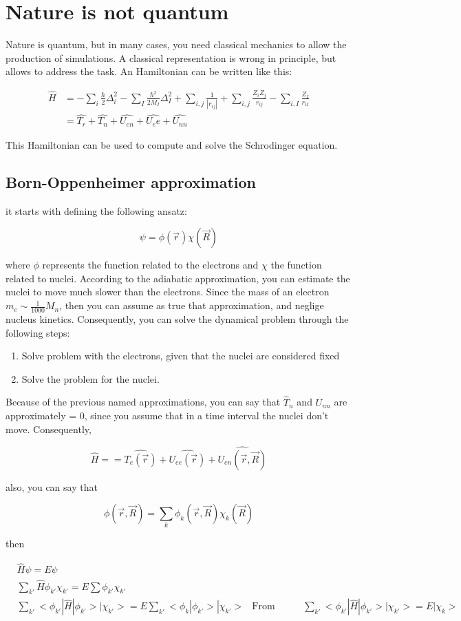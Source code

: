 \section{Nature is not quantum}
Nature is quantum, but in many cases, you need classical mechanics to allow the production of simulations.
A classical representation is wrong in principle, but allows to address the task.
An Hamiltonian can be written like this:

\begin{align*}
    \hat{H} &= - \sum_i{\frac{\hbar}{2} \Delta_i^2} - \sum_{I}{\frac{\hbar^2 }{2M_I} \Delta_I^2} + \sum_{i,j}\frac{1}{|r_{ij}|} + \sum_{i,j}\frac{Z_i Z_j}{r_{ij}} - \sum_{i, I}{\frac{Z_I}{r_{iI}}} \\
            &= \hat{T_r} + \hat{T_n} + \hat{U_{en}} + \hat{U_ee} + \hat{U_{nn}}
\end{align*}

This Hamiltonian can be used to compute and solve the Schrodinger equation.

\subsection{Born-Oppenheimer approximation}
it starts with defining the following ansatz:

$$
\psi = \phi(\vec{r}) \chi(\vec{R})
$$

where $\phi$ represents the function related to the electrons and $\chi$ the function related to nuclei. According to the adiabatic approximation, you can estimate the nuclei
to move much slower than the electrons. Since the mass of an electron $m_e \sim \frac{1}{1000} M_n$, then you can assume as true that approximation, and neglige nucleus kinetics.
Consequently, you can solve the dynamical problem through the following steps:

\begin{enumerate}
    \item Solve problem with the electrons, given that the nuclei are considered fixed
    \item Solve the problem for the nuclei.
\end{enumerate}

Because of the previous named approximations, you can say that $\hat{T}_n$ and $U_{nn}$ are approximately = 0, since you assume that in a time interval
the nuclei don't move. Consequently,

$$
    \hat{H} = = \hat{T_e(\vec{r})} + \hat{U_{ee}(\vec{r})} + \hat{U_{en}(\vec{r}, \vec{R})}
$$

also, you can say that

$$
    \phi(\vec{r}, \vec{R}) = \sum_k{\phi_k(\vec{r}, \vec{R}) \chi_k({\vec{R}})}
$$

then

\begin{align*}
    &\hat{H} \psi = E \psi &\\
    &\sum_{k'}{\hat{H} \phi_{k'} \chi_{k'}} = E \sum{\phi_{k'} \chi_{k'}} &\\
    &\sum_{k'}{<\phi_{k'}|\hat{H}|\phi_{k'}> |\chi_{k'}}> = E \sum_{k'}{<\phi_{k}|\phi_{k'}> |\chi_{k'}>} & \text{From which Kronecker delta}
    &\sum_{k'}{<\phi_{k'}|\hat{H}|\phi_{k'}> |\chi_{k'}}> = E |\chi_{k}> & 
\end{align*}
